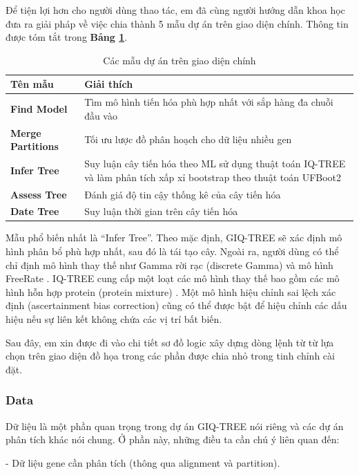 \documentclass[12pt]{report}
\begin{document}
Để tiện lợi hơn cho người dùng thao tác, em đã cùng người hướng dẫn khoa học đưa ra giải pháp về việc chia thành 5 mẫu dự án trên giao diện chính. Thông tin được tóm tắt trong \textbf{Bảng \ref{tbl:table4.2}}.

\begin{longtable}[c]{|p{3cm}|p{12cm}|}
\caption{Các mẫu dự án trên giao diện chính}
\label{tbl:table4.2}
\hline
\textbf{Tên mẫu} & \textbf{Giải thích}  \\
\endfirsthead
%
\endhead
%
\hline
		\textbf{Find Model}              & Tìm mô hình tiến hóa phù hợp nhất với sắp hàng đa chuỗi đầu vào                         \\ \hline
		\textbf{Merge Partitions}             & Tối ưu lược đồ phân hoạch cho dữ liệu nhiều gen               \\ \hline
		\textbf{Infer Tree}           & Suy luận cây tiến hóa theo ML sử dụng thuật toán IQ-TREE và làm phân tích xấp xỉ bootstrap theo thuật toán UFBoot2    \\ \hline
		\textbf{Assess Tree}              & Đánh giá độ tin cậy thống kê của cây tiến hóa      \\ \hline
		\textbf{Date Tree}             & Suy luận thời gian trên cây tiến hóa     \\ \hline
\end{longtable}

Mẫu phổ biến nhất là “Infer Tree”. Theo mặc định, GIQ-TREE sẽ xác định mô hình phân bổ phù hợp nhất, sau đó là tái tạo cây. Ngoài ra, người dùng có thể chỉ định mô hình thay thế như Gamma rời rạc (discrete Gamma)   và mô hình FreeRate  . IQ-TREE cung cấp một loạt các mô hình thay thế bao gồm các mô hình hỗn hợp protein (protein mixture)   . Một mô hình hiệu chỉnh sai lệch xác định (ascertainment bias correction) cũng có thể được bật để hiệu chỉnh các dấu hiệu nếu sự liên kết không chứa các vị trí bất biến.

Sau đây, em xin được đi vào chi tiết sơ đồ logic xây dựng dòng lệnh từ từ lựa chọn trên giao diện đồ họa trong các phần được chia nhỏ trong tinh chỉnh cài đặt.

\subsubsection{Data}
Dữ liệu là một phần quan trọng trong dự án GIQ-TREE nói riêng và các dự án phân tích khác nói chung. Ở phần này, những điều ta cần chú ý liên quan đến:

- Dữ liệu gene cần phân tích (thông qua alignment và partition).
\end{document}
